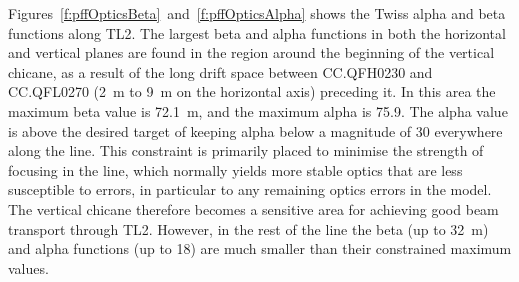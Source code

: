 Figures~\ref{f:pffOpticsBeta}~and~\ref{f:pffOpticsAlpha} shows the Twiss alpha and beta functions along TL2. The largest beta and alpha functions in both the horizontal and vertical planes are found in the region around the beginning of the vertical chicane, as a result of the long drift space between CC.QFH0230 and CC.QFL0270 (2~m to 9~m on the horizontal axis) preceding it. In this area the maximum beta value is 72.1~m, and the maximum alpha is 75.9. The alpha value is above the desired target of keeping alpha below a magnitude of 30 everywhere along the line. This constraint is primarily placed to minimise the strength of focusing in the line, which normally yields more stable optics that are less susceptible to errors, in particular to any remaining optics errors in the model. The vertical chicane therefore becomes a sensitive area for achieving good beam transport through TL2. However, in the rest of the line the beta (up to 32~m) and alpha functions (up to 18) are much smaller than their constrained maximum values.

